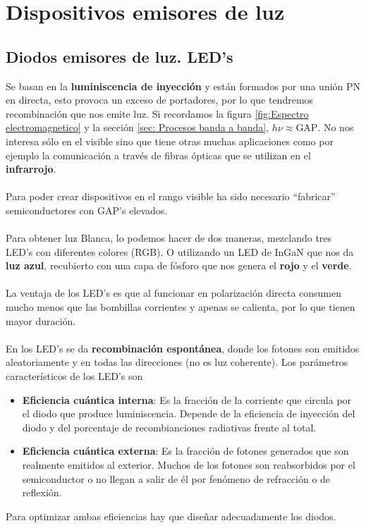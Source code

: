 \section{Dispositivos emisores de luz}
\subsection{Diodos emisores de luz. LED's}
Se basan en la \textbf{luminiscencia de inyección} y están formados por una unión PN en directa, esto provoca un exceso de portadores, por lo que tendremos recombinación que nos emite luz. Si recordamos la figura \ref{fig:Espectro electromagnetico} y la sección \ref{sec: Procesos banda a banda}, $h\nu\approx \text{GAP}$. No nos interesa sólo en el visible sino que tiene otras muchas aplicaciones como por ejemplo la comunicación a través de fibras ópticas que se utilizan en el \textbf{infrarrojo}.\\\\
Para poder crear dispositivos en el rango visible ha sido necesario ``fabricar'' semiconductores con GAP's elevados.\\\\
Para obtener luz Blanca, lo podemos hacer de dos maneras, mezclando tres LED's con diferentes colores (RGB). O utilizando un LED de InGaN que nos da \textbf{luz azul}, recubierto con una capa de fósforo que nos genera el \textbf{rojo} y el \textbf{verde}. \\\\
La ventaja de los LED's es que al funcionar en polarización directa consumen mucho menos que las bombillas corrientes y apenas se calienta, por lo que tienen mayor duración.
\\\\
En los LED's se da \textbf{recombinación espontánea}, donde los fotones son emitidos aleatoriamente y en todas las direcciones (no es luz coherente). Los parámetros característicos de los LED's son
\begin{itemize}
    \item \textbf{Eficiencia cuántica interna}: Es la fracción de la corriente que circula por el diodo que produce luminiscencia. Depende de la eficiencia de inyección del diodo y del porcentaje de recombianciones radiativas frente al total.
    \item \textbf{Eficiencia cuántica externa}: Es la fracción de fotones generados que son realmente emitidos al exterior. Muchos de los fotones son reabsorbidos por el semiconductor o no llegan a salir de él por fenómeno de refracción o de reflexión.
\end{itemize}
Para optimizar ambas eficiencias hay que diseñar adecuadamente los diodos.
